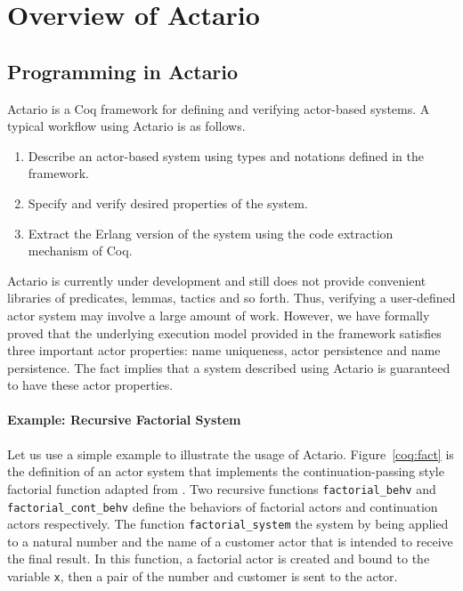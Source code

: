 \section{Overview of Actario}
\label{sec:overview}

\subsection{Programming in Actario}

Actario is a Coq framework for defining and verifying actor-based
systems. A typical workflow using Actario is as follows.
\begin{enumerate}
\item Describe an actor-based system using types and notations defined in the framework.
\item Specify and verify desired properties of the system.
\item Extract the Erlang version of the system using the code extraction mechanism of Coq.
\end{enumerate}

Actario is currently under development and still does not provide
convenient libraries of predicates, lemmas, tactics and so
forth. Thus, verifying a user-defined actor system may involve a large
amount of work. However, we have formally proved that the underlying
execution model provided in the framework satisfies three important
actor properties: name uniqueness, actor persistence and name
persistence. The fact implies that a system described using Actario is
guaranteed to have these actor properties.

\paragraph{Example: Recursive Factorial System}
Let us use a simple example to illustrate the usage of Actario.
Figure~\ref{coq:fact} is the definition of an actor system that implements the
continuation-passing style factorial function adapted from
\cite{Agha:1986aa}.  Two recursive functions \lstinline|factorial_behv| and
\lstinline|factorial_cont_behv| define the behaviors of factorial actors and
continuation actors respectively.  The function \lstinline|factorial_system| the
system by being applied to a natural number and the name of a customer
actor that is intended to receive the final result.  In this function,
a factorial actor is created and bound to the variable \lstinline|x|, then a pair
of the number and customer is sent to the actor.

